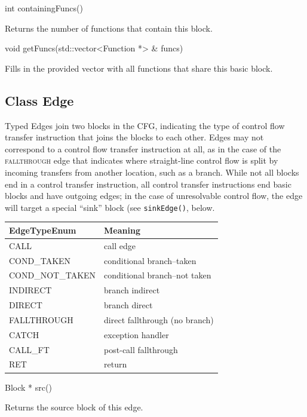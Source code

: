 \documentclass{article}
\newenvironment{apient}{\small\verbatim}{\endverbatim}
\newcommand{\apidesc}[1]{%
{\addtolength{\leftskip}{4em}%
#1\par\medskip}
}
\begin{document}
\begin{apient}
int containingFuncs()
\end{apient}
\apidesc{Returns the number of functions that contain this block.}

\begin{apient}
void getFuncs(std::vector<Function *> & funcs)
\end{apient}
\apidesc{Fills in the provided vector with all functions that share this basic block.}

\subsection{Class Edge}

Typed Edges join two blocks in the CFG, indicating the type of control flow
transfer instruction that joins the blocks to each other. Edges may not correspond
to a control flow transfer instruction at all, as in the case of the {\scshape
fallthrough} edge that indicates where straight-line control flow is split by
incoming transfers from another location, such as a branch. While not all
blocks end in a control transfer instruction, all control transfer instructions
end basic blocks and have outgoing edges; in the case of unresolvable control
flow, the edge will target a special ``sink'' block (see \texttt{sinkEdge()},
below.

\begin{center}
\begin{tabular}{ll}
\toprule
EdgeTypeEnum & Meaning \\
\midrule
CALL & call edge \\
COND\_TAKEN & conditional branch--taken \\
COND\_NOT\_TAKEN & conditional branch--not taken \\
INDIRECT & branch indirect \\
DIRECT & branch direct \\
FALLTHROUGH & direct fallthrough (no branch) \\
CATCH & exception handler \\
CALL\_FT & post-call fallthrough \\
RET & return \\
\bottomrule
\end{tabular}
\end{center}

\begin{apient}
Block * src()
\end{apient}
\apidesc{Returns the source block of this edge.}
\end{document}
